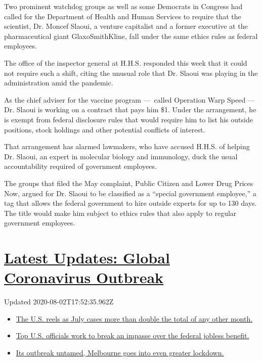 Two prominent watchdog groups as well as some Democrats in Congress had
called for the Department of Health and Human Services to require that
the scientist, Dr. Moncef Slaoui, a venture capitalist and a former
executive at the pharmaceutical giant GlaxoSmithKline, fall under the
same ethics rules as federal employees.

The office of the inspector general at H.H.S. responded this week that
it could not require such a shift, citing the unusual role that Dr.
Slaoui was playing in the administration amid the pandemic.

As the chief adviser for the vaccine program ---~called Operation Warp
Speed --- Dr. Slaoui is working on a contract that pays him \$1. Under
the arrangement, he is exempt from federal disclosure rules that would
require him to list his outside positions, stock holdings and other
potential conflicts of interest.

That arrangement has alarmed lawmakers, who have accused H.H.S. of
helping Dr. Slaoui, an expert in molecular biology and immunology, duck
the usual accountability required of government employees.

The groups that filed the May complaint, Public Citizen and Lower Drug
Prices Now, argued for Dr. Slaoui to be classified as a ``special
government employee,'' a tag that allows the federal government to hire
outside experts for up to 130 days. The title would make him subject to
ethics rules that also apply to regular government employees.

\hypertarget{latest-updates-global-coronavirus-outbreak}{%
\section{\texorpdfstring{\href{https://www.nytimes.com/2020/08/01/world/coronavirus-covid-19.html?action=click\&pgtype=Article\&state=default\&region=MAIN_CONTENT_1\&context=storylines_live_updates}{Latest
Updates: Global Coronavirus
Outbreak}}{Latest Updates: Global Coronavirus Outbreak}}\label{latest-updates-global-coronavirus-outbreak}}

Updated 2020-08-02T17:52:35.962Z

\begin{itemize}
\tightlist
\item
  \href{https://www.nytimes.com/2020/08/01/world/coronavirus-covid-19.html?action=click\&pgtype=Article\&state=default\&region=MAIN_CONTENT_1\&context=storylines_live_updates\#link-34047410}{The
  U.S. reels as July cases more than double the total of any other
  month.}
\item
  \href{https://www.nytimes.com/2020/08/01/world/coronavirus-covid-19.html?action=click\&pgtype=Article\&state=default\&region=MAIN_CONTENT_1\&context=storylines_live_updates\#link-780ec966}{Top
  U.S. officials work to break an impasse over the federal jobless
  benefit.}
\item
  \href{https://www.nytimes.com/2020/08/01/world/coronavirus-covid-19.html?action=click\&pgtype=Article\&state=default\&region=MAIN_CONTENT_1\&context=storylines_live_updates\#link-2bc8948}{Its
  outbreak untamed, Melbourne goes into even greater lockdown.}
\end{itemize}


